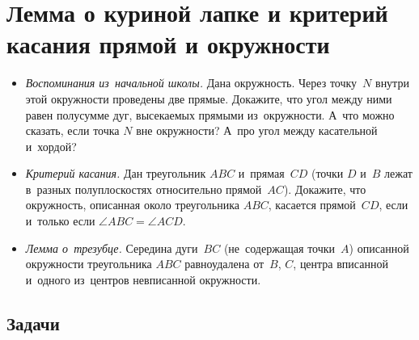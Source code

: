 

\section*{Лемма о куриной лапке и критерий касания прямой и окружности}


\begin{itemize}

\item\emph{Воспоминания из~начальной школы.}
Дана окружность.
Через точку~$N$ внутри этой окружности проведены две прямые.
Докажите, что угол между ними равен полусумме дуг, высекаемых прямыми
из~окружности.
А~что можно сказать, если точка $N$ вне окружности?
А~про угол между касательной и~хордой?

\item\emph{Критерий касания.}
Дан треугольник $ABC$ и~прямая~$CD$
(точки $D$ и~$B$ лежат в~разных полуплоскостях относительно прямой~$AC$).
Докажите, что окружность, описанная около треугольника $ABC$, касается
прямой~$CD$, если и~только если $\angle ABC = \angle ACD$.

\item\emph{Лемма о~трезубце.}
Середина дуги~$BC$ (не~содержащая точки~$A$) описанной окружности треугольника
$ABC$ равноудалена от~$B$, $C$, центра вписанной и~одного из~центров
невписанной окружности.

\end{itemize}


\subsection*{Задачи}

